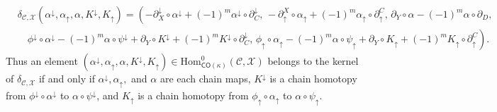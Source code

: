 \documentclass[11pt]{amsart}
\theoremstyle{definition}
\theoremstyle{remark}
\numberwithin{equation}{section}
\begin{document}
\begin{align}\label{diffl} &\delta_{\mathcal{C},\mathcal{X}} \left(\alpha^{\downarrow},\alpha_{\uparrow},\alpha,K^{\downarrow},K_{\uparrow}\right)=\left(-\partial^{\downarrow}_{X}\circ\alpha^{\downarrow}+(-1)^m\alpha^{\downarrow}\circ\partial^{\downarrow}_{C},\,-\partial_{\uparrow}^{X}\circ\alpha_{\uparrow}+(-1)^m\alpha_{\uparrow}\circ\partial_{\uparrow}^{C},\,\partial_Y\circ\alpha-(-1)^m\alpha\circ\partial_D,  \right. \\  & \quad \left. \phi^{\downarrow}\circ\alpha^{\downarrow}-(-1)^m\alpha\circ\psi^{\downarrow}+\partial_Y\circ K^{\downarrow}+(-1)^mK^{\downarrow}\circ\partial^{\downarrow}_{C}, \,
\phi_{\uparrow}\circ\alpha_{\uparrow}-(-1)^m\alpha\circ\psi_{\uparrow}+\partial_Y\circ K_{\uparrow}+(-1)^mK_{\uparrow}\circ\partial_{\uparrow}^{C}	
	 \right).  \nonumber \end{align} Thus an element $(\alpha^{\downarrow},\alpha_{\uparrow},\alpha,K^{\downarrow},K_{\uparrow})\in \mathrm{Hom}^{0}_{\mathsf{CO}(\kappa)}(\mathcal{C},\mathcal{X})$ belongs to the kernel of $\delta_{\mathcal{C},\mathcal{X}}$ if and only if $\alpha^{\downarrow},\alpha_{\uparrow},$ and $\alpha$ are each chain maps, $K^{\downarrow}$ is a chain homotopy from $\phi^{\downarrow}\circ\alpha^{\downarrow}$ to $\alpha\circ\psi^{\downarrow}$, and $K_{\uparrow}$ is a chain homotopy from $\phi_{\uparrow}\circ\alpha_{\uparrow}$ to $\alpha\circ\psi_{\uparrow}$.
\end{document}
